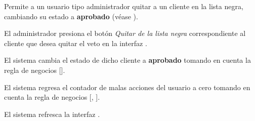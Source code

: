 %
%

{
  Permite a un usuario tipo administrador quitar a un cliente en la lista negra,
  cambiando su estado a \textbf{aprobado} (véase
  ).

  \begin{trayectoriaPrincipal}

    \item El administrador presiona el botón \textit{Quitar de la lista negra}
      correspondiente al cliente que desea quitar el veto en la interfaz
      .

    \item El sistema cambia el estado de dicho cliente a \textbf{aprobado}
      tomando en cuenta la regla de negocios [].

    \item El sistema regresa el contador de malas acciones del usuario a cero
      tomando en cuenta la regla de negocios [,
      ].

    \item El sistema refresca la interfaz .

  \end{trayectoriaPrincipal}
}
